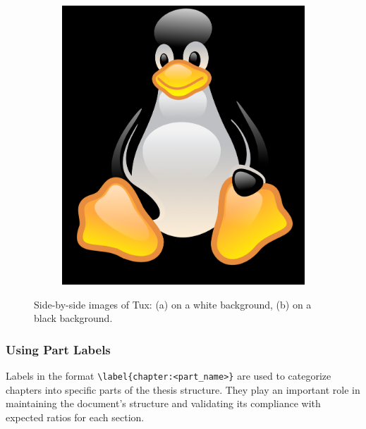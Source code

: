 \begin{figure}[htb]
\begin{subfigure}[b]{0.3\textwidth}
        \includegraphics[width=\textwidth]{figures/penguins/tux2.png} %
        \caption{} %
    \end{subfigure}
    
    \caption{Side-by-side images of Tux: (a) on a white background, (b) on a black background.} %
    \label{fig:sidebyside} %
\end{figure}

\subsubsection{Using Part Labels}
Labels in the format \texttt{\textbackslash label\{chapter:<part\_name>\}} are used to categorize chapters into specific parts of the thesis structure. They play an important role in maintaining the document's structure and validating its compliance with expected ratios for each section.


